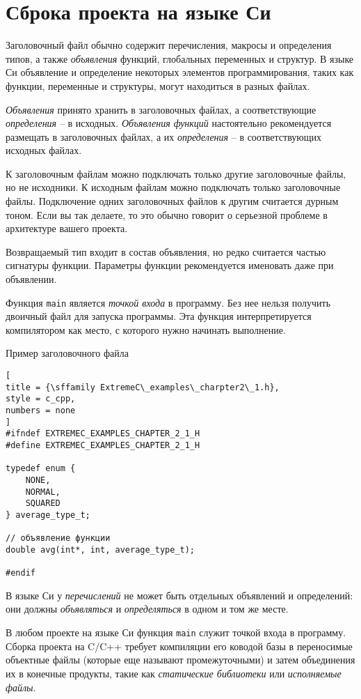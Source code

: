 \documentclass[%
	11pt,
	a4paper,
	utf8,
		]{article}
\begin{document}
\section{Сброка проекта на языке Си}

Заголовочный файл обычно содержит перечисления, макросы и определения типов, а также \emph{объявления} функций, глобальных переменных и структур. В языке Си объявление и определение некоторых элементов программирования, таких как функции, переменные и структуры, могут находиться в разных файлах.

\emph{Объявления} принято хранить в заголовочных файлах, а соответствующие \emph{определения} -- в исходных. \emph{Объявления функций} настоятельно рекомендуется размещать в заголовочных файлах, а их \emph{определения} -- в соответствующих исходных файлах.

К заголовочным файлам можно подключать только другие заголовочные файлы, но не исходники. К исходным файлам можно подключать только заголовочные файлы. {\color{red}Подключение одних заголовочных файлов к другим считается дурным тоном.} Если вы так делаете, то это обычно говорит о серьезной проблеме в архитектуре вашего проекта.

Возвращаемый тип входит в состав объявления, но редко считается частью сигнатуры функции. Параметры функции рекомендуется именовать даже при объявлении.

Функция \verb|main| является \emph{точкой входа} в программу. Без нее нельзя получить двоичный файл для запуска программы. Эта функция интерпретируется компилятором как место, с которого нужно начинать выполнение.

Пример заголовочного файла
\begin{lstlisting}[
title = {\sffamily ExtremeC\_examples\_charpter2\_1.h},
style = c_cpp,
numbers = none
]
#ifndef EXTREMEC_EXAMPLES_CHAPTER_2_1_H
#define EXTREMEC_EXAMPLES_CHAPTER_2_1_H

typedef enum {
    NONE,
    NORMAL,
    SQUARED
} average_type_t;

// объявление функции
double avg(int*, int, average_type_t);

#endif
\end{lstlisting}

В языке Си у \emph{перечислений} не может быть отдельных объявлений и определений: они должны \emph{объявляться} и \emph{определяться} в одном и том же месте.

В любом проекте на языке Си функция \verb|main| служит точкой входа в программу. Сборка проекта на C/C++ требует компиляции его ководой базы в переносимые объектные файлы (которые еще называют промежуточными) и затем объединения их в конечные продукты, такие как \emph{статические библиотеки} или \emph{исполняемые файлы}.
\end{document}
